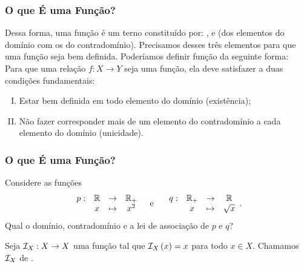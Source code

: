 \documentclass[brazil, notheorems, 10pt]{beamer}
\begin{document}

\begin{frame} \frametitle{O que É uma Função?} %

Dessa forma, uma função é um terno constituído por: ,
 e  (dos elementos do
domínio com os do contradomínio). Precisamos desses três elementos
para que uma função seja bem definida. Poderíamos definir
função da seguinte forma: \\
Para que uma relação $f: X \to Y$ seja
uma função, ela deve satisfazer a duas condições fundamentais:
\begin{enumerate}[(I)]
	\item Estar bem definida em todo elemento do domínio (existência);
	\item Não fazer corresponder mais de um elemento do contradomínio
	a cada elemento do domínio (unicidade).
\end{enumerate}

\end{frame}




\begin{frame}
\frametitle{O que É uma Função?} %
\begin{Exem}
Considere as funções
$$\begin{array}{cccc}
p : & \mathbb{R} & \to     & \mathbb{R}_+ \\
		 &  x & \mapsto & x^2
\end{array}
\text{\ \ \  e \ \ \ }
\begin{array}{cccc}
q : & \mathbb{R}_+ & \to     & \mathbb{R} \\
		 &  x & \mapsto & \sqrt x
\end{array}.$$
Qual o domínio, contradomínio e a lei de associação de $p$ e $q$?
\end{Exem}\pause

\begin{Exem}
Seja $\mathcal I_X : X \to X $ uma função tal que $\mathcal I_X \left(x\right) = x$ para
todo $x \in X$. Chamamos $\mathcal I_X$ de .
\end{Exem}

\end{frame}
\end{document}
